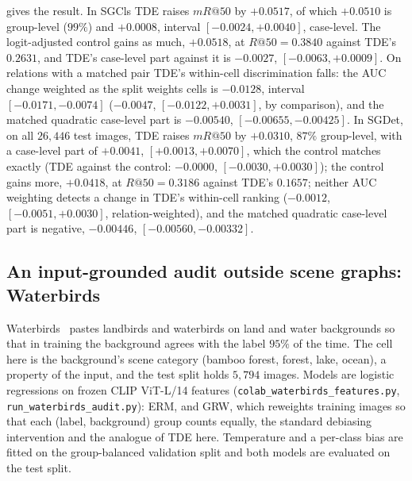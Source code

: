  gives the result. In SGCls TDE raises $mR@50$ by $+0.0517$, of which $+0.0510$
is group-level ($99\%$) and $+0.0008$, interval $[-0.0024,+0.0040]$, case-level. The
logit-adjusted control gains as much, $+0.0518$, at $R@50=0.3840$ against TDE's $0.2631$, and
TDE's case-level part against it is $-0.0027$, $[-0.0063,+0.0009]$. On relations with a
matched pair TDE's within-cell discrimination falls: the AUC change weighted as the split
weights cells is $-0.0128$, interval $[-0.0171,-0.0074]$ ($-0.0047$, $[-0.0122,+0.0031]$, by
comparison), and the matched quadratic case-level part is $-0.00540$, $[-0.00655,-0.00425]$.
In SGDet, on all $26{,}446$ test images, TDE raises $mR@50$ by $+0.0310$, $87\%$
group-level, with a case-level part of $+0.0041$, $[+0.0013,+0.0070]$, which the control
matches exactly (TDE against the control: $-0.0000$, $[-0.0030,+0.0030]$); the control gains
more, $+0.0418$, at $R@50=0.3186$ against TDE's $0.1657$; neither AUC weighting detects a
change in TDE's within-cell ranking ($-0.0012$, $[-0.0051,+0.0030]$, relation-weighted), and
the matched quadratic case-level part is negative, $-0.00446$, $[-0.00560,-0.00332]$.

\begin{table}[t]
\centering
\footnotesize
\caption{\textbf{Recall of the SGCls and SGDet checkpoints}, released (repository README) and
replayed by the inline evaluator (graph constraint), on the full test set.}
\label{tab:detrecall}

\end{table}

\begin{table}[t]
\centering
\footnotesize
\setlength\tabcolsep{3pt}
\caption{\textbf{The audit in SGCls and SGDet.} Mean recall@50 split (graph constraint,
micro-averaged, grouping by ground-truth class pair) with its image-clustered case-level
interval and group-level share, and the within-cell AUC change on relations with a matched
pair, by comparison ($c$) and as the split weights cells ($r$); image bootstrap.}
\label{tab:det}

\end{table}

\subsection{An input-grounded audit outside scene graphs: Waterbirds}\label{app:waterbirds}

Waterbirds~\cite{sagawa2020distributionally} pastes landbirds and waterbirds on land and water
backgrounds so that in training the background agrees with the label $95\%$ of the time. The
cell here is the background's scene category (bamboo forest, forest, lake, ocean), a property
of the input, and the test split holds $5{,}794$ images. Models are logistic regressions on
frozen CLIP ViT-L/14 features (\texttt{colab\_waterbirds\_features.py},
\texttt{run\_waterbirds\_audit.py}): ERM, and GRW, which reweights training images so that each
(label, background) group counts equally, the standard debiasing intervention and the analogue
of TDE here. Temperature and a per-class bias are fitted on the group-balanced validation split
and both models are evaluated on the test split.

